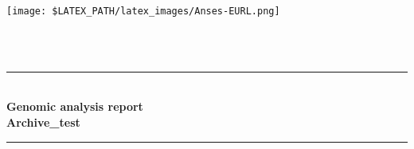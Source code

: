 \documentclass[a4paper]{article}
\begin{document}
\begin{titlepage}

\newcommand{\HRule}{\rule{\linewidth}{0.5mm}} %
\setlength{\topmargin}{0in}

\begin{minipage}{0.4\textwidth}
\begin{flushleft} \large
\hspace*{-0.5cm}
\texttt{[image: \$LATEX\_PATH/latex\_images/Anses-EURL.png]}\\ 
\end{flushleft}
\end{minipage}\\[2cm]
~
\center %



\HRule \\[0.4cm]
{ \huge \bfseries Genomic analysis report}\\[0.4cm] %
{ \huge \bfseries Archive\_test}\\[0.4cm] %
\HRule \\[1cm]
 


\end{titlepage}
\end{document}
